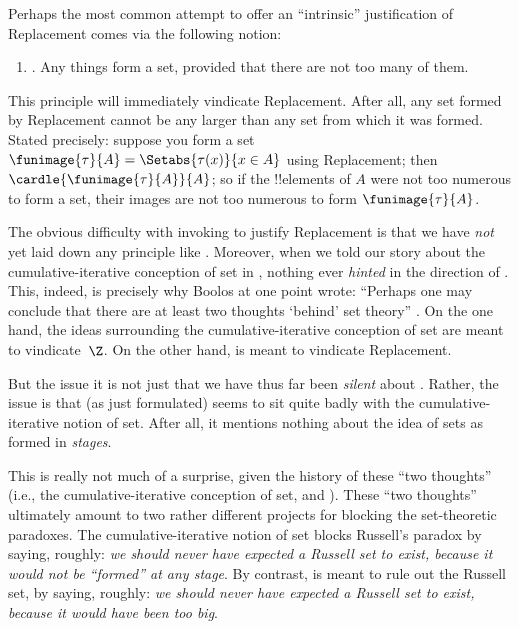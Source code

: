\documentclass[../../../include/open-logic-section]{subfiles}
\begin{document}

Perhaps the most common attempt to offer an ``intrinsic'' justification of
Replacement comes via the following notion:
\begin{enumerate}
	\item[] \limofsize. Any things form a set, provided that there are
	not too many of them.
\end{enumerate}
This principle will immediately vindicate Replacement. After all, any
set formed by Replacement cannot be any larger than any set from which
it was formed. Stated precisely: suppose you form a set
$\funimage{\tau}{A} = \Setabs{\tau(x)}{x \in A}$ using Replacement;
then $\cardle{\funimage{\tau}{A}}{A}$; so if the !!{element}s of $A$
were not too numerous to form a set, their images are not too numerous
to form $\funimage{\tau}{A}$. 

The obvious difficulty with invoking \limofsize{} to justify
Replacement is that we have \emph{not} yet laid down any principle
like \limofsize. Moreover, when we told our story about the
cumulative-iterative conception of set in
, nothing ever \emph{hinted}
in the direction of \limofsize. This, indeed, is precisely why Boolos
at one point wrote: ``Perhaps one may conclude that there are at least
two thoughts `behind' set theory'' \cite[p.~19]{Boolos1989}. On
the one hand, the ideas surrounding the cumulative-iterative
conception of set are meant to vindicate~$\Z$. On the other hand,
\limofsize{} is meant to vindicate Replacement. 

But the issue it is not just that we have thus far been \emph{silent}
about \limofsize. Rather, the issue is that \limofsize{} (as just
formulated) seems to sit quite badly with the cumulative-iterative
notion of set. After all, it mentions nothing about the idea of sets
as formed in \emph{stages}.

This is really not much of a surprise, given the history of these
``two thoughts'' (i.e., the cumulative-iterative conception of set,
and \limofsize). These ``two thoughts'' ultimately amount to two
rather  different projects for blocking the set-theoretic paradoxes.
The cumulative-iterative notion of set blocks Russell's paradox by
saying, roughly: \emph{we should never have expected a Russell set to
exist, because it would not be ``formed'' at any stage}. By contrast,
\limofsize{} is meant to rule out the Russell set, by saying, roughly:
\emph{we should never have expected a Russell set to exist, because it
would have been too big}. 
\end{document}
